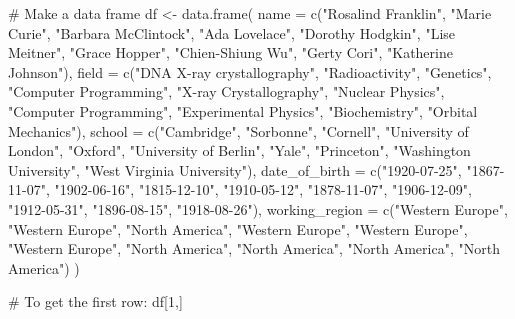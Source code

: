 \documentclass[
  letterpaper,
  DIV=11,
  numbers=noendperiod]{scrreprt}
\newenvironment{Shaded}{\begin{snugshade}}{\end{snugshade}}
\newcommand{\AttributeTok}[1]{\textcolor[rgb]{0.40,0.45,0.13}{#1}}
\newcommand{\CommentTok}[1]{\textcolor[rgb]{0.37,0.37,0.37}{#1}}
\newcommand{\DecValTok}[1]{\textcolor[rgb]{0.68,0.00,0.00}{#1}}
\newcommand{\FunctionTok}[1]{\textcolor[rgb]{0.28,0.35,0.67}{#1}}
\newcommand{\NormalTok}[1]{\textcolor[rgb]{0.00,0.23,0.31}{#1}}
\newcommand{\OtherTok}[1]{\textcolor[rgb]{0.00,0.23,0.31}{#1}}
\newcommand{\StringTok}[1]{\textcolor[rgb]{0.13,0.47,0.30}{#1}}
\begin{document}
\begin{Shaded}
\begin{Highlighting}[]
\CommentTok{\# Make a data frame}
\NormalTok{df }\OtherTok{\textless{}{-}} \FunctionTok{data.frame}\NormalTok{(}
  \AttributeTok{name =} \FunctionTok{c}\NormalTok{(}\StringTok{"Rosalind Franklin"}\NormalTok{, }\StringTok{"Marie Curie"}\NormalTok{, }\StringTok{"Barbara McClintock"}\NormalTok{, }\StringTok{"Ada Lovelace"}\NormalTok{, }\StringTok{"Dorothy Hodgkin"}\NormalTok{, }
           \StringTok{"Lise Meitner"}\NormalTok{, }\StringTok{"Grace Hopper"}\NormalTok{, }\StringTok{"Chien{-}Shiung Wu"}\NormalTok{, }\StringTok{"Gerty Cori"}\NormalTok{, }\StringTok{"Katherine Johnson"}\NormalTok{),}
  \AttributeTok{field =} \FunctionTok{c}\NormalTok{(}\StringTok{"DNA X{-}ray crystallography"}\NormalTok{, }\StringTok{"Radioactivity"}\NormalTok{, }\StringTok{"Genetics"}\NormalTok{, }\StringTok{"Computer Programming"}\NormalTok{, }\StringTok{"X{-}ray Crystallography"}\NormalTok{, }
            \StringTok{"Nuclear Physics"}\NormalTok{, }\StringTok{"Computer Programming"}\NormalTok{, }\StringTok{"Experimental Physics"}\NormalTok{, }\StringTok{"Biochemistry"}\NormalTok{, }\StringTok{"Orbital Mechanics"}\NormalTok{),}
  \AttributeTok{school =} \FunctionTok{c}\NormalTok{(}\StringTok{"Cambridge"}\NormalTok{, }\StringTok{"Sorbonne"}\NormalTok{, }\StringTok{"Cornell"}\NormalTok{, }\StringTok{"University of London"}\NormalTok{, }\StringTok{"Oxford"}\NormalTok{, }
             \StringTok{"University of Berlin"}\NormalTok{, }\StringTok{"Yale"}\NormalTok{, }\StringTok{"Princeton"}\NormalTok{, }\StringTok{"Washington University"}\NormalTok{, }\StringTok{"West Virginia University"}\NormalTok{),}
  \AttributeTok{date\_of\_birth =} \FunctionTok{c}\NormalTok{(}\StringTok{"1920{-}07{-}25"}\NormalTok{, }\StringTok{"1867{-}11{-}07"}\NormalTok{, }\StringTok{"1902{-}06{-}16"}\NormalTok{, }\StringTok{"1815{-}12{-}10"}\NormalTok{, }\StringTok{"1910{-}05{-}12"}\NormalTok{, }
                    \StringTok{"1878{-}11{-}07"}\NormalTok{, }\StringTok{"1906{-}12{-}09"}\NormalTok{, }\StringTok{"1912{-}05{-}31"}\NormalTok{, }\StringTok{"1896{-}08{-}15"}\NormalTok{, }\StringTok{"1918{-}08{-}26"}\NormalTok{),}
  \AttributeTok{working\_region =} \FunctionTok{c}\NormalTok{(}\StringTok{"Western Europe"}\NormalTok{, }\StringTok{"Western Europe"}\NormalTok{, }\StringTok{"North America"}\NormalTok{, }\StringTok{"Western Europe"}\NormalTok{, }\StringTok{"Western Europe"}\NormalTok{, }\StringTok{"Western Europe"}\NormalTok{, }\StringTok{"North America"}\NormalTok{, }\StringTok{"North America"}\NormalTok{, }\StringTok{"North America"}\NormalTok{,  }\StringTok{"North America"}\NormalTok{)}
\NormalTok{)}

\CommentTok{\# To get the first row:}
\NormalTok{df[}\DecValTok{1}\NormalTok{,]}
\end{Highlighting}
\end{Shaded}
\end{document}
